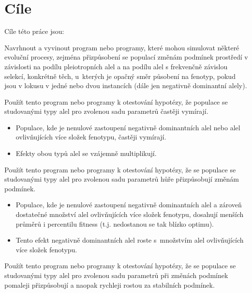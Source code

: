 \chapter{Cíle}


Cíle této práce jsou:


\begin{enumerate}
    \item{Navrhnout a vyvinout program nebo programy, které mohou simulovat některé evoluční procesy, zejména přizpůsobení
    se populací změnám podmínek prostředí v závislosti na podílu pleiotropních alel a na podílu alel s frekvenčně
    závislou selekcí, konkrétně těch, u~kterých je opačný směr působení na fenotyp, pokud jsou v lokusu v jedné nebo
    dvou instancích (dále jen negativně dominantní alely).
    \item{Použít tento program nebo programy k otestování hypotézy, že populace se studovanými typy alel  pro zvolenou
         sadu parametrů častěji vymírají.}
        \begin{itemize}
            \item{Populace, kde je nenulové zastoupení negativně dominantních alel nebo alel ovlivňujících více
                  složek fenotypu, častěji vymírají.}
            \item{Efekty obou typů alel se vzájemně multiplikují.}
        \end{itemize}
    }
    \item{Použít tento program nebo programy k otestování hypotézy, že se populace se studovanými typy alel pro zvolenou
         sadu parametrů hůře přizpůsobují změnám podmínek.
        \begin{itemize}
            \item{Populace, kde je nenulové zastoupení negativně dominantních alel a zároveň dostatečné množství
                       alel ovlivňujících více složek fenotypu, dosahují menších průměrů i percentilu fitness (t.j.
                       nedostanou se tak blízko optimu).}
            \item{Tento efekt negativně dominantních alel roste s množstvím alel ovlivňujících více složek fenotypu.}
        \end{itemize}
    }
    \item{Použít tento program nebo programy k otestování hypotézy, že se populace se studovanými typy alel pro zvolenou
         sadu parametrů při změnách podmínek pomaleji přizpůsobují a naopak rychleji rostou za stabilních podmínek.

}
\end{enumerate}
